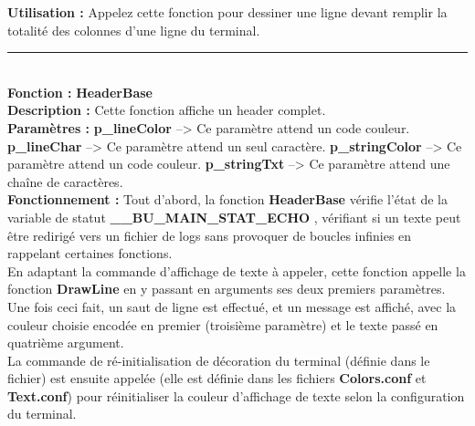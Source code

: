 \documentclass[a4paper,10pt]{article}
\begin{document}
\textbf{Utilisation :}\linebreak
Appelez cette fonction pour dessiner une ligne devant remplir la totalité des colonnes d'une ligne du terminal.\\[2\baselineskip]


\par\noindent\rule{\textwidth}{0.4pt}\\[1\baselineskip]
\textbf{Fonction : }\color{mauve}\textbf{HeaderBase}\color{white}\\[1\baselineskip]
\textbf{Description :}\linebreak
Cette fonction affiche un header complet.\\[1\baselineskip]

\textbf{Paramètres :}\linebreak
\color{orange}\textbf{p\_lineColor }\color{white} --> Ce paramètre attend un code couleur.\linebreak
\color{orange}\textbf{p\_lineChar }\color{white} --> Ce paramètre attend un seul caractère.\linebreak
\color{orange}\textbf{p\_stringColor }\color{white} --> Ce paramètre attend un code couleur.\linebreak
\color{orange}\textbf{p\_stringTxt }\color{white} --> Ce paramètre attend une chaîne de caractères.\\[1\baselineskip]

\textbf{Fonctionnement :}\linebreak
Tout d'abord, la fonction \color{mauve}\textbf{HeaderBase }\color{white} vérifie l'état de la variable de statut \color{orange}\textbf{\_\_BU\_MAIN\_STAT\_ECHO }\color{white}, vérifiant si un texte peut être redirigé vers un fichier de logs sans provoquer de boucles infinies en rappelant certaines fonctions\color{white}.\\[1\baselineskip]

En adaptant la commande d'affichage de texte à appeler, cette fonction appelle la fonction \color{mauve}\textbf{DrawLine }\color{white} en y passant en arguments ses deux premiers paramètres.\\[1\baselineskip]

Une fois ceci fait, un saut de ligne est effectué, et un message est affiché, avec la couleur choisie encodée en premier (troisième paramètre) et le texte passé en quatrième argument.\\[1\baselineskip]

La commande de ré-initialisation de décoration du terminal (définie dans le fichier) est ensuite appelée (elle est définie dans les fichiers \color{lime}\textbf{Colors.conf }\color{white} et \color{lime}\textbf{Text.conf}\color{white}) pour réinitialiser la couleur d'affichage de texte selon la configuration du terminal.\\[1\baselineskip]
\end{document}
